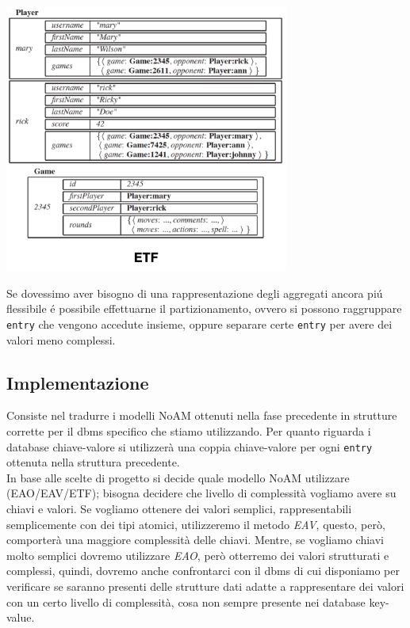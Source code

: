 \includegraphics[width=0.7\textwidth]{img/etf}

Se dovessimo aver bisogno di una rappresentazione degli aggregati ancora piú flessibile é possibile effettuarne il partizionamento,
ovvero si possono raggruppare \texttt{entry} che vengono accedute insieme, oppure separare certe \texttt{entry} per avere dei
valori meno complessi.

\subsection{Implementazione}
Consiste nel tradurre i modelli NoAM ottenuti nella fase precedente in strutture corrette per il dbms specifico che stiamo utilizzando.
Per quanto riguarda i database chiave-valore si utilizzerà una coppia chiave-valore per ogni \texttt{entry} ottenuta nella struttura
precedente.\\
In base alle scelte di progetto si decide quale modello NoAM utilizzare (EAO/EAV/ETF); bisogna decidere che livello di
complessità vogliamo avere su chiavi e valori.
Se vogliamo ottenere dei valori semplici, rappresentabili semplicemente con dei tipi atomici, utilizzeremo il metodo \emph{EAV}, questo, però, comporterà una maggiore complessità delle chiavi.
Mentre, se vogliamo chiavi molto semplici dovremo utilizzare \emph{EAO}, però otterremo dei valori strutturati e complessi, quindi, dovremo anche confrontarci con
il dbms di cui disponiamo per verificare se saranno presenti delle strutture dati adatte a rappresentare dei valori con un certo livello di complessità, cosa non sempre
presente nei database key-value.\\

